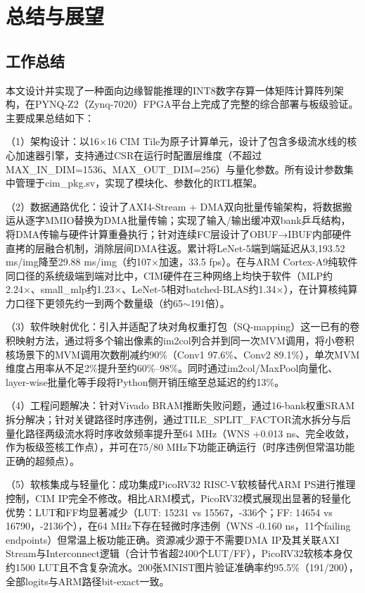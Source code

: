 \documentclass[bachelor,compact,nofont]{xjtuthesis}
\numberwithin{equation}{chapter}
\begin{document}
\chapter{总结与展望}

\section{工作总结}

本文设计并实现了一种面向边缘智能推理的INT8数字存算一体矩阵计算阵列架构，在PYNQ-Z2（Zynq-7020）FPGA平台上完成了完整的综合部署与板级验证。主要成果总结如下：

（1）架构设计：以16×16 CIM Tile为原子计算单元，设计了包含多级流水线的核心加速器引擎，支持通过CSR在运行时配置层维度（不超过MAX\_IN\_DIM=1536、MAX\_OUT\_DIM=256）与量化参数。所有设计参数集中管理于cim\_pkg.sv，实现了模块化、参数化的RTL框架。

（2）数据通路优化：设计了AXI4-Stream + DMA双向批量传输架构，将数据搬运从逐字MMIO替换为DMA批量传输；实现了输入/输出缓冲双bank乒乓结构，将DMA传输与硬件计算重叠执行；针对连续FC层设计了OBUF→IBUF内部硬件直拷的层融合机制，消除层间DMA往返。累计将LeNet-5端到端延迟从3,193.52 ms/img降至29.88 ms/img（约107×加速，33.5 fps）。在与ARM Cortex-A9纯软件同口径的系统级端到端对比中，CIM硬件在三种网络上均快于软件（MLP约2.24×、small\_mlp约1.23×、LeNet-5相对batched-BLAS约1.34×），在计算核纯算力口径下更领先约一到两个数量级（约65$\sim$191倍）。

（3）软件映射优化：引入并适配了块对角权重打包（SQ-mapping）这一已有的卷积映射方法，通过将多个输出像素的im2col列合并到同一次MVM调用，将小卷积核场景下的MVM调用次数削减约90\%（Conv1 97.6\%、Conv2 89.1\%），单次MVM维度占用率从不足2\%提升至约60\%--98\%。同时通过im2col/MaxPool向量化、layer-wise批量化等手段将Python侧开销压缩至总延迟的约13\%。

（4）工程问题解决：针对Vivado BRAM推断失败问题，通过16-bank权重SRAM拆分解决；针对关键路径时序违例，通过TILE\_SPLIT\_FACTOR流水拆分与后量化路径两级流水将时序收敛频率提升至64 MHz（WNS +0.013 ns、完全收敛，作为板级签核工作点），并可在75/80 MHz下功能正确运行（时序违例但常温功能正确的超频点）。

（5）软核集成与轻量化：成功集成PicoRV32 RISC-V软核替代ARM PS进行推理控制，CIM IP完全不修改。相比ARM模式，PicoRV32模式展现出显著的轻量化优势：LUT和FF均显著减少（LUT: 15231 vs 15567，-336个；FF: 14654 vs 16790，-2136个），在64 MHz下存在轻微时序违例（WNS -0.160 ns，11个failing endpoints）但常温上板功能正确。资源减少源于不需要DMA IP及其关联AXI Stream与Interconnect逻辑（合计节省超2400个LUT/FF），PicoRV32软核本身仅约1500 LUT且不含复杂流水。200张MNIST图片验证准确率约95.5\%（191/200），全部logits与ARM路径bit-exact一致。
\end{document}

